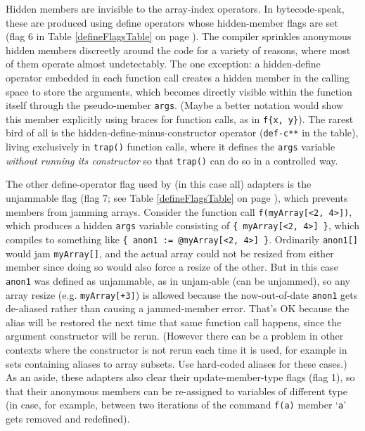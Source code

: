 \documentclass{article}
\begin{document}
Hidden members are invisible to the array-index operators.  In bytecode-speak, these are produced using define operators whose hidden-member flags are set (flag 6 in Table \ref{defineFlagsTable} on page \pageref{defineFlagsTable}).  The compiler sprinkles anonymous hidden members discreetly around the code for a variety of reasons, where most of them operate almost undetectably.  The one exception:  a hidden-define operator embedded in each function call creates a hidden member in the calling space to store the arguments, which becomes directly visible within the function itself through the pseudo-member \verb#args#.  (Maybe a better notation would show this member explicitly using braces for function calls, as in \verb#f{x, y}#).  The rarest bird of all is the hidden-define-minus-constructor operator (\verb#def-c**# in the table), living exclusively in \verb#trap()# function calls, where it defines the \verb#args# variable \emph{without running its constructor} so that \verb#trap()# can do so in a controlled way.

The other define-operator flag used by (in this case all) adapters is the unjammable flag (flag 7; see Table \ref{defineFlagsTable} on page \pageref{defineFlagsTable}), which prevents members from jamming arrays.  Consider the function call \verb#f(myArray[<2, 4>])#, which produces a hidden \verb$args$ variable consisting of \verb${ myArray[<2, 4>] }$, which compiles to something like \verb${ anon1 := @myArray[<2, 4>] }$.  Ordinarily \verb$anon1[]$ would jam \verb$myArray[]$, and the actual array could not be resized from either member since doing so would also force a resize of the other.  But in this case \verb$anon1$ was defined as unjammable, as in unjam-able (can be unjammed), so any array resize (e.g. \verb#myArray[+3]#) is allowed because the now-out-of-date \verb$anon1$ gets de-aliased rather than causing a jammed-member error.  That's OK because the alias will be restored the next time that same function call happens, since the argument constructor will be rerun.  (However there can be a problem in other contexts where the constructor is not rerun each time it is used, for example in sets containing aliases to array subsets.  Use hard-coded aliases for these cases.)  As an aside, these adapters also clear their update-member-type flags (flag 1), so that their anonymous members can be re-assigned to variables of different type (in case, for example, between two iterations of the command \verb#f(a)# member `\verb#a#' gets removed and redefined).
\end{document}

